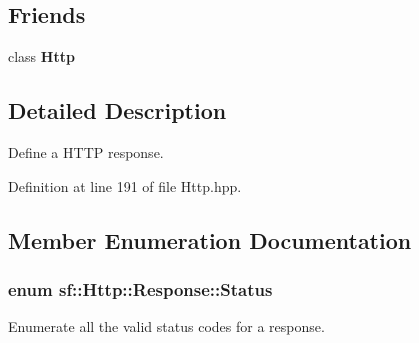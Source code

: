 \subsection*{Friends}
\begin{DoxyCompactItemize}
\item 
\hypertarget{classsf_1_1Http_1_1Response_aba95e2a7762bb5df986048b05d03a22e}{class {\bfseries Http}}\label{classsf_1_1Http_1_1Response_aba95e2a7762bb5df986048b05d03a22e}

\end{DoxyCompactItemize}


\subsection{Detailed Description}
Define a H\-T\-T\-P response. 

Definition at line 191 of file Http.\-hpp.



\subsection{Member Enumeration Documentation}
\hypertarget{classsf_1_1Http_1_1Response_a663e071978e30fbbeb20ed045be874d8}{
\subsubsection[{Status}]{\setlength{\rightskip}{0pt plus 5cm}enum {\bf sf\-::\-Http\-::\-Response\-::\-Status}}}\label{classsf_1_1Http_1_1Response_a663e071978e30fbbeb20ed045be874d8}


Enumerate all the valid status codes for a response. 

